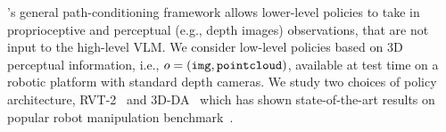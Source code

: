 \method's general path-conditioning framework allows lower-level policies to take in proprioceptive and perceptual (e.g., depth images) observations, that are not input to the high-level VLM. 
% 
We consider low-level policies based on 3D perceptual information, i.e., $o=({\tt{img}}, {\tt{pointcloud}})$, available at test time on a robotic platform with standard depth cameras. We study two choices of policy architecture, RVT-2~\citep{goyal2024rvt} and 3D-DA~\citep{ke20243d} which has shown state-of-the-art results on popular robot manipulation benchmark~\citep{james2020rlbench}.


